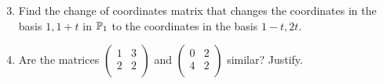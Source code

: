 \documentclass[../psets.tex]{subfiles}
\begin{document}
\begin{enumerate}[label={\textbf{8.\arabic*.}}]
    \setcounter{enumi}{2}
    \item Find the change of coordinates matrix that changes the coordinates in the basis $1,1+t$ in $\mathbb{P}_1$ to the coordinates in the basis $1-t,2t$.
    \setcounter{enumi}{5}
    \item Are the matrices $
        \left(
        \begin{smallmatrix}
            1 & 3\\
            2 & 2\\
        \end{smallmatrix}
        \right)
    $ and $
        \left(
        \begin{smallmatrix}
            0 & 2\\
            4 & 2\\
        \end{smallmatrix}
        \right)
    $ similar? Justify.
\end{enumerate}
\end{document}
